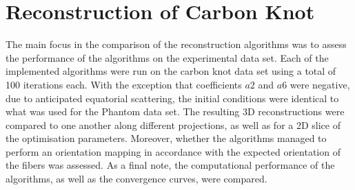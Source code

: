 \section{Reconstruction of Carbon Knot}


The main focus in the comparison of the reconstruction algorithms was to assess the performance of the algorithms on the experimental data set.
Each of the implemented algorithms were run on the carbon knot data set using a total of 100 iterations each.
\noindent
With the exception that coefficients $a2$ and $a6$ were negative, due to anticipated equatorial scattering, the initial conditions were identical to what was used for the Phantom data set.
The resulting 3D reconstructions were compared to one another along different projections, as well as for a 2D slice of the optimisation parameters.
Moreover, whether the algorithms managed to perform an orientation mapping in accordance with the expected orientation of the fibers was assessed.
As a final note, the computational performance of the algorithms, as well as the convergence curves, were compared.